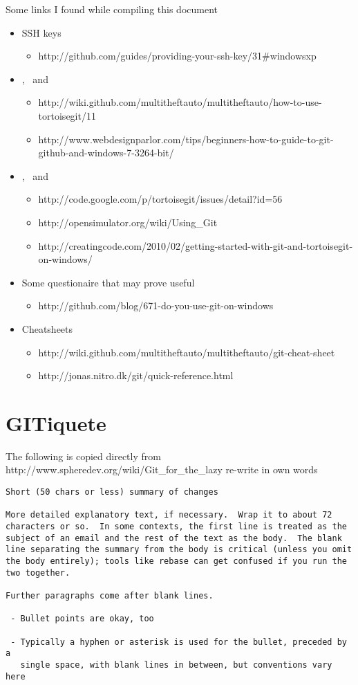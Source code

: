 Some links I found while compiling this document
\begin{itemize}
 \item SSH keys
 \begin{itemize}
  \item http://github.com/guides/providing-your-ssh-key/31\#windowsxp
 \end{itemize}
 \item \git, \msys\ and \gh
 \begin{itemize}
  \item http://wiki.github.com/multitheftauto/multitheftauto/how-to-use-tortoisegit/11
  \item http://www.webdesignparlor.com/tips/beginners-how-to-guide-to-git-github-and-windows-7-3264-bit/
 \end{itemize}
 \item \git, \cyg\ and \gh 
 \begin{itemize} 
  \item http://code.google.com/p/tortoisegit/issues/detail?id=56
  \item http://opensimulator.org/wiki/Using\_Git
  \item http://creatingcode.com/2010/02/getting-started-with-git-and-tortoisegit-on-windows/
 \end{itemize}
 \item Some questionaire that may prove useful
 \begin{itemize} 
  \item http://github.com/blog/671-do-you-use-git-on-windows
 \end{itemize}
 \item Cheatsheets
 \begin{itemize}
 \item http://wiki.github.com/multitheftauto/multitheftauto/git-cheat-sheet
 \item http://jonas.nitro.dk/git/quick-reference.html
 \end{itemize}
\end{itemize}

\section{GITiquete}

The following is copied directly from http://www.spheredev.org/wiki/Git\_for\_the\_lazy \ed re-write in own words\ed

\begin{verbatim}
Short (50 chars or less) summary of changes

More detailed explanatory text, if necessary.  Wrap it to about 72
characters or so.  In some contexts, the first line is treated as the
subject of an email and the rest of the text as the body.  The blank
line separating the summary from the body is critical (unless you omit
the body entirely); tools like rebase can get confused if you run the
two together.

Further paragraphs come after blank lines.

 - Bullet points are okay, too

 - Typically a hyphen or asterisk is used for the bullet, preceded by a
   single space, with blank lines in between, but conventions vary here
\end{verbatim}
